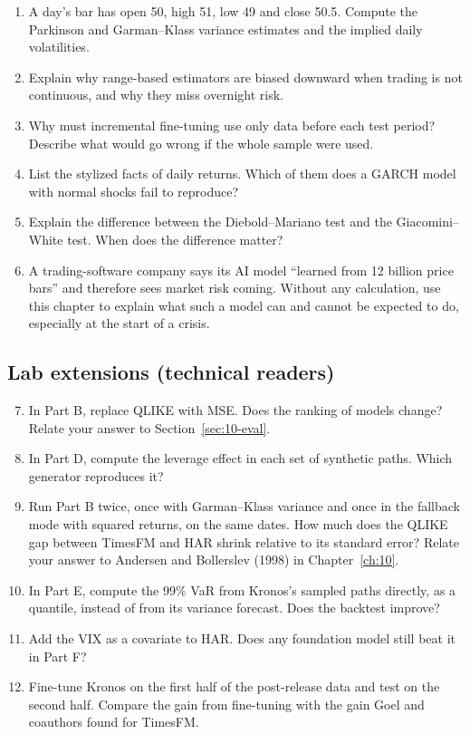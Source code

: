 \begin{enumerate}
  \item A day's bar has open 50, high 51, low 49 and close 50.5. Compute the Parkinson and Garman--Klass variance estimates and the implied daily volatilities.
  \item Explain why range-based estimators are biased downward when trading is not continuous, and why they miss overnight risk.
  \item Why must incremental fine-tuning use only data before each test period? Describe what would go wrong if the whole sample were used.
  \item List the stylized facts of daily returns. Which of them does a GARCH model with normal shocks fail to reproduce?
  \item Explain the difference between the Diebold--Mariano test and the Giacomini--White test. When does the difference matter?
  \item A trading-software company says its AI model ``learned from 12 billion price bars'' and therefore sees market risk coming. Without any calculation, use this chapter to explain what such a model can and cannot be expected to do, especially at the start of a crisis.
\end{enumerate}

\subsection*{Lab extensions (technical readers)}

\begin{enumerate}
  \setcounter{enumi}{6}
  \item In Part B, replace QLIKE with MSE. Does the ranking of models change? Relate your answer to Section~\ref{sec:10-eval}.
  \item In Part D, compute the leverage effect in each set of synthetic paths. Which generator reproduces it?
  \item Run Part B twice, once with Garman--Klass variance and once in the fallback mode with squared returns, on the same dates. How much does the QLIKE gap between TimesFM and HAR shrink relative to its standard error? Relate your answer to Andersen and Bollerslev (1998) in Chapter~\ref{ch:10}.
  \item In Part E, compute the 99\% VaR from Kronos's sampled paths directly, as a quantile, instead of from its variance forecast. Does the backtest improve?
  \item Add the VIX as a covariate to HAR. Does any foundation model still beat it in Part F?
  \item Fine-tune Kronos on the first half of the post-release data and test on the second half. Compare the gain from fine-tuning with the gain Goel and coauthors found for TimesFM.
\end{enumerate}
